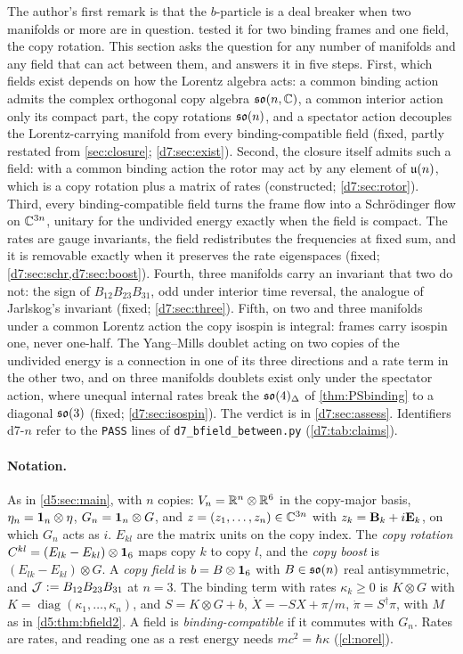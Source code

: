 The author's first remark is that the $b$-particle is a deal breaker when two manifolds or more are in question. 
tested it for two binding frames and one field, the copy rotation. This section asks the question for any number of manifolds and any
field that can act between them, and answers it in five steps. First, which fields exist depends on how the Lorentz algebra acts: a common
binding action admits the complex orthogonal copy algebra $\mathfrak{so}(n,\mathbb{C})$, a common interior action only its compact part, the copy rotations $\mathfrak{so}(n)$, and a spectator action decouples the Lorentz-carrying manifold from every
binding-compatible field (fixed, partly restated from \cref{sec:closure}; \cref{d7:sec:exist}). Second, the closure itself admits such a field: with a
common binding action the rotor may act by any element of $\mathfrak{u}(n)$, which is a copy rotation plus a matrix of rates (constructed;
\cref{d7:sec:rotor}). Third, every binding-compatible field turns the frame flow into a Schr\"odinger flow on $\mathbb{C}^{3n}$, unitary for the
undivided energy exactly when the field is compact. The rates are gauge invariants, the field redistributes the frequencies at fixed sum, and
it is removable exactly when it preserves the rate eigenspaces (fixed; \cref{d7:sec:schr,d7:sec:boost}). Fourth, three manifolds carry an
invariant that two do not: the sign of $B_{12}B_{23}B_{31}$, odd under interior time reversal, the analogue of Jarlskog's invariant (fixed;
\cref{d7:sec:three}). Fifth, on two and three manifolds under a common Lorentz action the copy isospin is integral: frames carry isospin one, never one-half. The Yang--Mills doublet acting on two copies
of the undivided energy is a connection in one of its three directions and a rate term in the other two, and on three manifolds doublets exist only under the
spectator action, where unequal internal rates break the $\mathfrak{so}(4)_\Delta$ of \cref{thm:PSbinding} to a diagonal $\mathfrak{so}(3)$ (fixed; \cref{d7:sec:isospin}). The verdict
is in \cref{d7:sec:assess}. Identifiers d7-$n$ refer to the \texttt{PASS} lines of \texttt{d7\_bfield\_between.py} (\cref{d7:tab:claims}).

\paragraph{Notation.} As in \cref{d5:sec:main}, with $n$ copies: $V_n=\mathbb{R}^n\otimes\mathbb{R}^6$ in the copy-major basis, $\eta_n=\mathbf 1_n\otimes\eta$,
$G_n=\mathbf 1_n\otimes G$, and $z=(z_1,\dots,z_n)\in\mathbb{C}^{3n}$ with $z_k=\mathbf B_k+i\mathbf E_k$, on which $G_n$ acts as $i$. $E_{kl}$ are the matrix units on the copy
index. The \emph{copy rotation} $C^{kl}=(E_{lk}-E_{kl})\otimes\mathbf 1_6$ maps copy $k$ to copy $l$, and the \emph{copy boost} is $(E_{lk}-E_{kl})\otimes G$. A
\emph{copy field} is $b=B\otimes\mathbf 1_6$ with $B\in\mathfrak{so}(n)$ real antisymmetric, and $\mathcal J :=B_{12}B_{23}B_{31}$ at $n=3$. The binding term with
rates $\kappa_k\ge0$ is $K\otimes G$ with $K=\operatorname{diag}(\kappa_1,\dots,\kappa_n)$, and $S=K\otimes G+b$, $\dot X=-SX+\pi/m$, $\dot\pi=S^\dagger\pi$, with
$M$ as in \cref{d5:thm:bfield2}. A field is \emph{binding-compatible} if it commutes with $G_n$. Rates are rates, and reading one as a rest
energy needs $mc^2=\hbar\kappa$ (\cref{cl:norel}).

